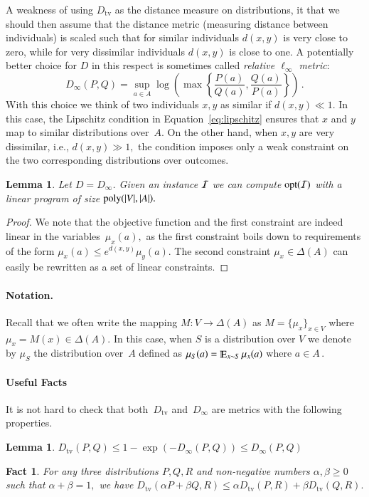 \documentclass[letterpaper,11pt]{article}
\newtheorem{lemma}[theorem]{Lemma}%
\newtheorem{fact}{Fact}[section]
\theoremstyle{definition}
\newcommand{\poly}{{\rm poly}}
\renewcommand{\mathbb}{\varmathbb}
\newcommand{\Esymb}{\mathbb{E}}
\DeclareMathOperator*{\E}{\Esymb}
\newcommand{\mper}{\,.}
\newcommand{\cI}{{\cal I}}
\newcommand{\opt}{\mathrm{opt}}
\newcommand{\tv}{\mathrm{tv}}
\begin{document}
A weakness of using $D_\tv$ as the distance measure on distributions, it that we should then assume that the distance
metric (measuring distance between individuals) is scaled such that for similar individuals $d(x,y)$ is very close to zero,
while for very dissimilar individuals $d(x,y)$ is close to one. A potentially better choice for $D$ in this respect is
sometimes called
\emph{relative $\ell_\infty$ metric}:
\begin{equation}\label{eq:relinfty}
D_\infty(P,Q)
=\sup_{a\in A}\log\left(
\max\left\{
\frac{P(a)}{Q(a)},\frac{Q(a)}{P(a)}\right\}
\right)
\mper
\end{equation}
With this choice
we think of two individuals $x,y$ as similar if $d(x,y)\ll 1.$ In this case,
the Lipschitz condition in Equation~\ref{eq:lipschitz}
ensures that $x$ and $y$ map to similar distributions
over~$A.$ On the other hand, when $x,y$ are very dissimilar, i.e., $d(x,y)\gg
1,$ the condition imposes only a weak constraint on the two corresponding
distributions over outcomes.
%
\begin{lemma}\label{lem:optinfty}
Let $D = D_\infty$.
Given an instance $\cI$ we can compute $\opt(\cI)$
with a linear program of size $\poly(|V|,|A|).$
\end{lemma}

\begin{proof}
We note that the objective function and the
first constraint are indeed linear in the
variables~$\mu_x(a),$
as the first constraint boils down to requirements of the form
$\mu_x(a) \le e^{d(x,y)}\mu_y(a)$.
The second constraint $\mu_x\in\Delta(A)$ can easily be
rewritten as a set of linear constraints.
\end{proof}
%


\paragraph{Notation.}
Recall that we often write the mapping $M\colon V\to\Delta(A)$ as
$M=\{\mu_x\}_{x\in V}$ where $\mu_x=M(x)\in\Delta(A).$
In this case, when $S$ is a distribution over $V$ we denote by $\mu_S$ the
distribution over~$A$ defined as
$\mu_S(a) = \E_{x\sim S}\mu_x(a)$ where $a\in A\mper$

\paragraph{Useful Facts}
It is not hard to check that both~$D_\tv$ and~$D_\infty$ are metrics with the
following properties.
\begin{lemma}\label{lem:tv2inf}
$D_\tv(P,Q)\le 1-\exp(-D_\infty(P,Q))\le  D_\infty(P,Q)$
\end{lemma}
\begin{fact}\label{fac:tvconv}
For any three distributions $P,Q,R$ and non-negative numbers
$\alpha,\beta\ge0$ such that $\alpha+\beta=1,$ we have $D_\tv(\alpha P+\beta
Q,R)\le \alpha D_\tv(P,R)+\beta D_\tv(Q,R).$
\end{fact}
\end{document}
